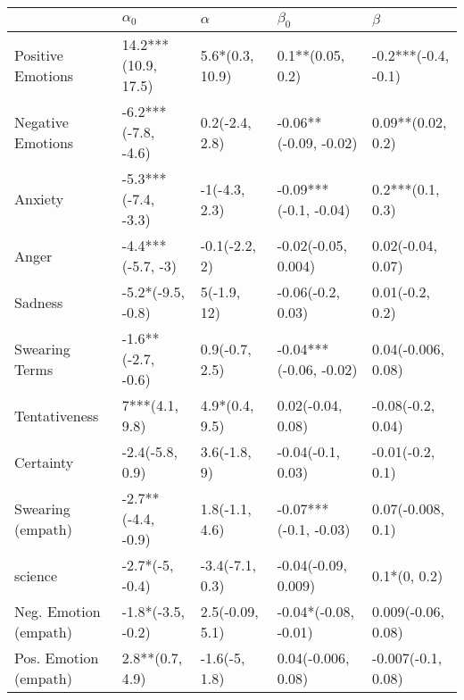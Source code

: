 \begin{tabular}{lllll}
\toprule
{} &           $\alpha_0$ &         $\alpha$ &               $\beta_0$ &              $\beta$ \\
\midrule
Positive Emotions     &  14.2***(10.9, 17.5) &  5.6*(0.3, 10.9) &        0.1**(0.05, 0.2) &  -0.2***(-0.4, -0.1) \\
Negative Emotions     &  -6.2***(-7.8, -4.6) &   0.2(-2.4, 2.8) &   -0.06**(-0.09, -0.02) &    0.09**(0.02, 0.2) \\
Anxiety               &  -5.3***(-7.4, -3.3) &    -1(-4.3, 2.3) &   -0.09***(-0.1, -0.04) &     0.2***(0.1, 0.3) \\
Anger                 &    -4.4***(-5.7, -3) &    -0.1(-2.2, 2) &     -0.02(-0.05, 0.004) &    0.02(-0.04, 0.07) \\
Sadness               &    -5.2*(-9.5, -0.8) &      5(-1.9, 12) &       -0.06(-0.2, 0.03) &      0.01(-0.2, 0.2) \\
Swearing Terms        &   -1.6**(-2.7, -0.6) &   0.9(-0.7, 2.5) &  -0.04***(-0.06, -0.02) &   0.04(-0.006, 0.08) \\
Tentativeness         &       7***(4.1, 9.8) &   4.9*(0.4, 9.5) &       0.02(-0.04, 0.08) &    -0.08(-0.2, 0.04) \\
Certainty             &      -2.4(-5.8, 0.9) &     3.6(-1.8, 9) &       -0.04(-0.1, 0.03) &     -0.01(-0.2, 0.1) \\
Swearing (empath)     &   -2.7**(-4.4, -0.9) &   1.8(-1.1, 4.6) &   -0.07***(-0.1, -0.03) &    0.07(-0.008, 0.1) \\
science               &      -2.7*(-5, -0.4) &  -3.4(-7.1, 0.3) &     -0.04(-0.09, 0.009) &         0.1*(0, 0.2) \\
Neg. Emotion (empath) &    -1.8*(-3.5, -0.2) &  2.5(-0.09, 5.1) &    -0.04*(-0.08, -0.01) &   0.009(-0.06, 0.08) \\
Pos. Emotion (empath) &      2.8**(0.7, 4.9) &    -1.6(-5, 1.8) &      0.04(-0.006, 0.08) &   -0.007(-0.1, 0.08) \\
\bottomrule
\end{tabular}

